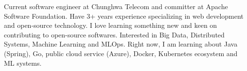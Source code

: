 

\begin{cvparagraph}

Current software engineer at Chunghwa Telecom and committer at Apache Software Foundation. Have 3+ years experience specializing in web development and open-source technology. I love learning something new and keen on contributing to open-source softwares. Interested in Big Data, Distributed Systems, Machine Learning and MLOps. Right now, I am learning about Java (Spring), Go, public cloud service (Azure), Docker, Kubernetes ecosystem and ML systems.
\end{cvparagraph}
